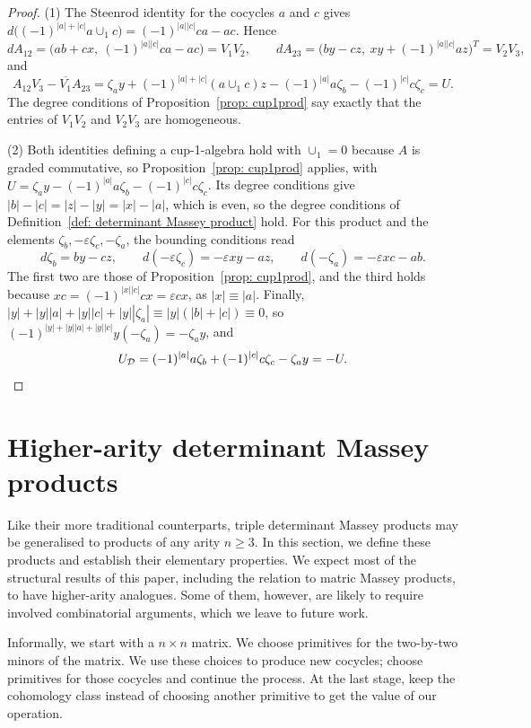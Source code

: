 \documentclass[11pt]{article}
\theoremstyle{definition}
\theoremstyle{definition}
\begin{document}
\begin{proof}
(1) The Steenrod identity for the cocycles $a$ and $c$ gives
$d\bigl((-1)^{|a|+|c|}a\cup_1c\bigr)=(-1)^{|a||c|}ca-ac$. Hence
\[
dA_{12}=\bigl(ab+cx,\ (-1)^{|a||c|}ca-ac\bigr)=V_1V_2,\qquad
dA_{23}=\bigl(by-cz,\ xy+(-1)^{|a||c|}az\bigr)^T=V_2V_3,
\]
and
\[
A_{12}V_3-\overline{V_1}A_{23}
=\zeta_ay+(-1)^{|a|+|c|}(a\cup_1c)z-(-1)^{|a|}a\zeta_b
-(-1)^{|c|}c\zeta_c=U.
\]
The degree conditions of Proposition~\ref{prop: cup1prod} say exactly
that the entries of $V_1V_2$ and $V_2V_3$ are homogeneous.

(2) Both identities defining a cup-1-algebra hold with $\cup_1=0$
because $A$ is graded commutative, so
Proposition~\ref{prop: cup1prod} applies, with
$U=\zeta_ay-(-1)^{|a|}a\zeta_b-(-1)^{|c|}c\zeta_c$. Its degree
conditions give $|b|-|c|=|z|-|y|=|x|-|a|$, which is even, so the
degree conditions of Definition~\ref{def: determinant Massey product}
hold. For this product and the elements
$\zeta_b,-\varepsilon\zeta_c,-\zeta_a$, the bounding conditions read
\[
d\zeta_b=by-cz,\qquad d(-\varepsilon\zeta_c)=-\varepsilon xy-az,\qquad
d(-\zeta_a)=-\varepsilon xc-ab.
\]
The first two are those of Proposition~\ref{prop: cup1prod}, and the
third holds because $xc=(-1)^{|x||c|}cx=\varepsilon cx$, as
$|x|\equiv|a|$. Finally,
$|y|+|y||a|+|y||c|+|y||\zeta_a|\equiv|y|(|b|+|c|)\equiv0$, so
$(-1)^{|y|+|y||a|+|y||c|}y(-\zeta_a)=-\zeta_ay$, and
\[
U_{\mathcal D}=(-1)^{|a|}a\zeta_b+(-1)^{|c|}c\zeta_c-\zeta_ay=-U.
\qedhere
\]
\end{proof}



\section{Higher-arity determinant Massey products}
\label{sec: Higher-order determinant Massey products}

Like their more traditional counterparts, triple determinant Massey products  may be generalised to products of any arity $n\geq 3$.
In this section, we define these products and establish their elementary properties.
We expect most of the structural results of this paper, including the relation to matric Massey products, to have higher-arity analogues.
Some of them, however, are likely to require involved combinatorial arguments, which we leave to future work.

\smallskip

Informally, we start with a $n\times n$ matrix. We choose primitives for the two-by-two minors of the matrix. We use these choices to produce new cocycles; choose primitives for those cocycles and continue the process. At the last stage, keep the cohomology class instead of choosing another primitive to get the value of our operation.
\end{document}
